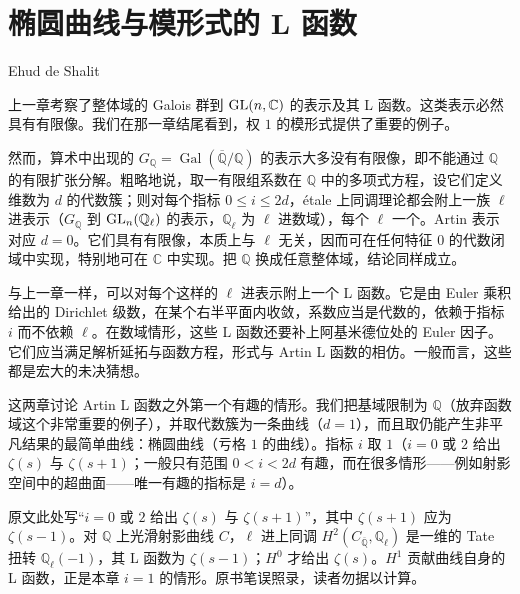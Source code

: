 \chapter{椭圆曲线与模形式的 L 函数}\label{ch:05}

\begin{center}
Ehud de Shalit
\end{center}

上一章考察了整体域的 Galois 群到 $\mathrm{GL}(n,\mathbb{C})$ 的表示及其 L 函数。这类表示必然具有有限像。我们在那一章结尾看到，权 $1$ 的模形式提供了重要的例子。

然而，算术中出现的 $G_{\mathbb{Q}}=\operatorname{Gal}(\overline{\mathbb{Q}}/\mathbb{Q})$ 的表示大多没有有限像，即不能通过 $\mathbb{Q}$ 的有限扩张分解。粗略地说，取一有限组系数在 $\mathbb{Q}$ 中的多项式方程，设它们定义维数为 $d$ 的代数簇；则对每个指标 $0\le i\le 2d$，étale 上同调理论都会附上一族 $\ell$ 进表示（$G_{\mathbb{Q}}$ 到 $\mathrm{GL}_n(\mathbb{Q}_\ell)$ 的表示，$\mathbb{Q}_\ell$ 为 $\ell$ 进数域），每个 $\ell$ 一个。Artin 表示对应 $d=0$。它们具有有限像，本质上与 $\ell$ 无关，因而可在任何特征 $0$ 的代数闭域中实现，特别地可在 $\mathbb{C}$ 中实现。把 $\mathbb{Q}$ 换成任意整体域，结论同样成立。

与上一章一样，可以对每个这样的 $\ell$ 进表示附上一个 L 函数。它是由 Euler 乘积给出的 Dirichlet 级数，在某个右半平面内收敛，系数应当是代数的，依赖于指标 $i$ 而不依赖 $\ell$。在数域情形，这些 L 函数还要补上阿基米德位处的 Euler 因子。它们应当满足解析延拓与函数方程，形式与 Artin L 函数的相仿。一般而言，这些都是宏大的未决猜想。

这两章讨论 Artin L 函数之外第一个有趣的情形。我们把基域限制为 $\mathbb{Q}$（放弃函数域这个非常重要的例子），并取代数簇为一条曲线（$d=1$），而且取仍能产生非平凡结果的最简单曲线：椭圆曲线（亏格 $1$ 的曲线）。指标 $i$ 取 $1$（$i=0$ 或 $2$ 给出 $\zeta(s)$ 与 $\zeta(s+1)$；一般只有范围 $0<i<2d$ 有趣，而在很多情形——例如射影空间中的超曲面——唯一有趣的指标是 $i=d$）。

\begin{annote}
原文此处写“$i=0$ 或 $2$ 给出 $\zeta(s)$ 与 $\zeta(s+1)$”，其中 $\zeta(s+1)$ 应为 $\zeta(s-1)$。对 $\mathbb{Q}$ 上光滑射影曲线 $C$，$\ell$ 进上同调 $H^2(C_{\overline{\mathbb{Q}}},\mathbb{Q}_\ell)$ 是一维的 Tate 扭转 $\mathbb{Q}_\ell(-1)$，其 L 函数为 $\zeta(s-1)$；$H^0$ 才给出 $\zeta(s)$。$H^1$ 贡献曲线自身的 L 函数，正是本章 $i=1$ 的情形。原书笔误照录，读者勿据以计算。
\par\vspace{0.15em}{\raggedleft 【来源：原书 p.~89（A）；Milne《Lectures on Étale Cohomology》（A）；Silverman《The Arithmetic of Elliptic Curves》附录 C（A）】\par}
\end{annote}

